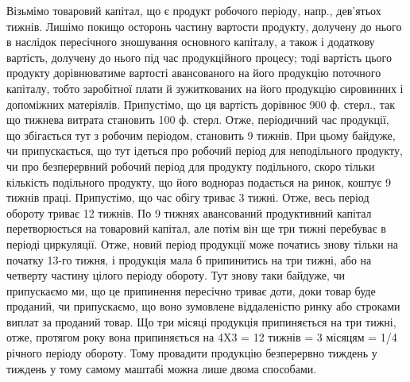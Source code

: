 Візьмімо товаровий капітал, що є продукт робочого періоду, напр.,
дев’ятьох тижнів. Лишімо покищо осторонь частину вартости продукту,
долучену до нього в наслідок пересічного зношування основного капіталу,
а також і додаткову вартість, долучену до нього під час продукційного
процесу; тоді вартість цього продукту дорівнюватиме вартості
авансованого на його продукцію поточного капіталу, тобто заробітної плати
й зужиткованих на його продукцію сировинних і допоміжних матеріялів.
Припустімо, що ця вартість дорівнює 900 ф. стерл., так що тижнева
витрата становить 100 ф. стерл. Отже, періодичний час продукції, що
збігається тут з робочим періодом, становить 9 тижнів. При цьому байдуже,
чи припускається, що тут ідеться про робочий період для неподільного
продукту, чи про безперервний робочий період для продукту
подільного, скоро тільки кількість подільного продукту, що його воднораз
подається на ринок, коштує 9 тижнів праці. Припустімо, що час
обігу триває 3 тижні. Отже, весь період обороту триває 12 тижнів.
По 9 тижнях авансований продуктивний капітал перетворюється на товаровий
капітал, але потім він ще три тижні перебуває в періоді циркуляції.
Отже, новий період продукції може початись знову тільки на початку
13-го тижня, і продукція мала б припинитись на три тижні, або на
четверту частину цілого періоду обороту. Тут знову таки байдуже, чи
припускаємо ми, що це припинення пересічно триває доти, доки товар
буде проданий, чи припускаємо, що воно зумовлене віддаленістю ринку
або строками виплат за проданий товар. Що три місяці продукція
припиняється на три тижні, отже, протягом року вона припиняється на
4X3 = 12 тижнів = 3 місяцям = 1/4 річного періоду обороту. Тому
провадити продукцію безперервно тиждень у тиждень у тому самому
маштабі можна лише двома способами.

